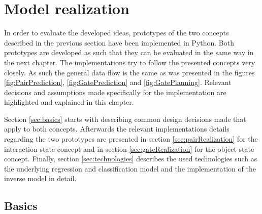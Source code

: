 \chapter{Model realization\label{chap:modelReal}}




In order to evaluate the developed ideas, prototypes of the two concepts described in the previous section have been implemented in Python. Both prototypes are developed as such that they can be evaluated in the same way in the next chapter. The implementations try to follow the presented concepts very closely. As such the general data flow is the same as was presented in the figures  \ref{fig:PairPrediction}, \ref{fig:GatePrediction} and \ref{fig:GatePlanning}.
Relevant decisions and assumptions made specifically for the implementation are highlighted and explained in this chapter. %

Section \ref{sec:basics} starts with describing common design decisions made that apply to both concepts. Afterwards the relevant implementations details regarding the two prototypes are presented in section \ref{sec:pairRealization} for the interaction state concept and in section \ref{sec:gateRealization} for the object state concept. Finally, section \ref{sec:technologies} describes the used technologies such as the underlying regression and classification model and the implementation of the inverse model in detail.

\section{Basics \label{sec:basics}}


